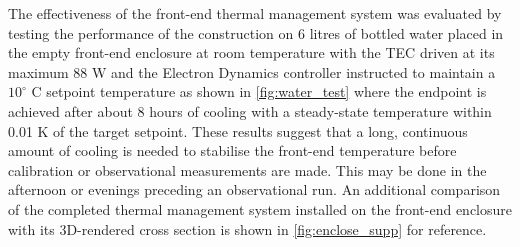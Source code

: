 The effectiveness of the front-end thermal management system was evaluated by testing the performance of the construction on 6 litres of bottled water placed in the empty front-end enclosure at room temperature with the TEC driven at its maximum 88 W and the Electron Dynamics controller instructed to maintain a $10^\circ$ C setpoint temperature as shown in \cref{fig:water_test} where the endpoint is achieved after about 8 hours of cooling with a steady-state temperature within 0.01 K of the target setpoint. These results suggest that a long, continuous amount of cooling is needed to stabilise the front-end temperature before calibration or observational measurements are made. This may be done in the afternoon or evenings preceding an observational run. An additional comparison of the completed thermal management system installed on the front-end enclosure with its 3D-rendered cross section is shown in \cref{fig:enclose_supp} for reference.
